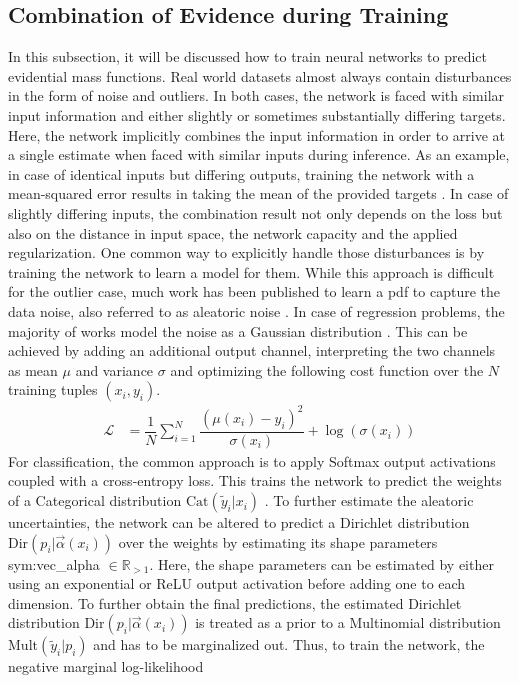 \subsection{Combination of Evidence during Training}
\label{subsec:uncertainties_ev_theory}
In this subsection, it will be discussed how to train neural networks to predict evidential mass functions. Real world datasets almost always contain disturbances in the form of noise and outliers. In both cases, the network is faced with similar input information and either slightly or sometimes substantially differing targets. Here, the network implicitly combines the input information in order to arrive at a single estimate when faced with similar inputs during inference. As an example, in case of identical inputs but differing outputs, training the network with a mean-squared error results in taking the mean of the provided targets \cite{goodfellow2016deep}. In case of slightly differing inputs, the combination result not only depends on the loss but also on the distance in input space, the network capacity and the applied regularization. One common way to explicitly handle those disturbances is by training the network to learn a model for them. While this approach is difficult for the outlier case, much work has been published to learn a \gls{pdf} to capture the data noise, also referred to as aleatoric noise \cite{kendall2017uncertainties}.
In case of regression problems, the majority of works model the noise as a Gaussian distribution \cite{yang2020d3vo,feng2019leveraging,kendall2017uncertainties}. This can be achieved by adding an additional output channel, interpreting the two channels as mean $\mu$ and variance $\sigma$ and optimizing the following cost function over the $N$ training tuples $(x_i,y_i)$.
\begin{align}
	\mathcal{L} &= \dfrac{1}{N}\sum_{i=1}^{N} \dfrac{(\mu(x_i) - y_i)^2}{\sigma(x_i)}+\log(\sigma(x_i))
\end{align}
For classification, the common approach is to apply Softmax output activations coupled with a cross-entropy loss. This trains the network to predict the weights of a Categorical distribution $\mathrm{Cat}(\tilde{y}_i|x_i)$ \cite{goodfellow2016deep}. To further estimate the aleatoric uncertainties, the network can be altered to predict a Dirichlet distribution $\mathrm{Dir}(p_i|\vec{\alpha}(x_i))$ over the weights by estimating its shape parameters \gls{sym:vec_alpha} $\in \mathbb{R}_{>1}$. Here, the shape parameters can be estimated by either using an exponential \cite{wu2019quantifying} or ReLU \cite{sensoy2018evidential} output activation before adding one to each dimension. To further obtain the final predictions, the estimated Dirichlet distribution $\mathrm{Dir}(p_i|\vec{\alpha}(x_i))$ is treated as a prior to a Multinomial distribution $\mathrm{Mult}(\tilde{y}_i|p_i)$ and has to be marginalized out. Thus, to train the network, the negative marginal log-likelihood 
